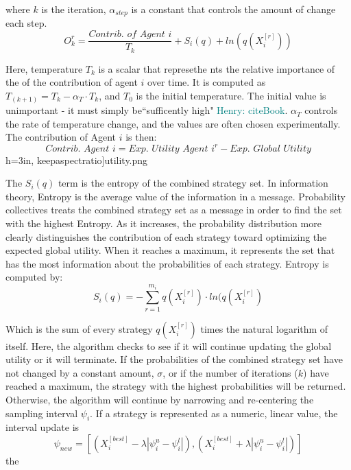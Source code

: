 \documentclass{sig-alternate}
\newcommand{\allcomments}[1]{{#1}}
\newcommand{\hfcomment}[1]{\textcolor{Teal}{\allcomments{Henry: {#1}}}}
\begin{document}
where $k$ is the iteration, $\alpha_{step}$ is a constant that controls the amount of change each step.
	\begin{equation}
	O_k^r = \dfrac{\textit{Contrib. of Agent }i}{T_k}+S_i(q)+ln(q(X_i^{[r]}))
	\end{equation}
	
Here, temperature $T_k$ is a scalar that represethe nts the relative importance of the of the contribution of agent $i$ over time. It is computed as $T_{(k+1)}=T_{k} - \alpha_{T}\cdot T_{k}$, and $T_0$ is the initial temperature. The initial value is unimportant - it must simply be``sufficently high" \hfcomment{cite{Book}}. $\alpha_{T}$ controls the rate of temperature change, and the values are often chosen experimentally.
The contribution of Agent $i$ is then:
	\begin{equation}
	\textit{Contrib. Agent }i = \textit{Exp. Utility Agent }i^r - \textit{Exp. Global Utility}
	\end{equation}h=3in, keepaspectratio]{utility.png}

The $S_i(q)$ term is the entropy of the combined strategy set. In information theory, Entropy is the average value of the information in a message. Probability collectives treats the combined strategy set as a message in order to find the set with the highest Entropy. As it increases, the probability distribution more clearly distinguishes the contribution of each strategy toward optimizing the expected global utility. When it reaches a maximum, it represents the set that has the most information about the probabilities of each strategy. Entropy is computed by:
	\begin{equation}
	S_i(q)=-\sum_{r=1}^{m_i}q(X_i^{[r]})\cdot ln(q(X_i^{[r]})
	\end{equation}
	
Which is the sum of every strategy $q(X_i^{[r]})$ times the natural logarithm of itself. Here, the algorithm checks to see if it will continue updating the global utility or it will terminate. If the probabilities of the combined strategy set have not changed by a constant amount, $\sigma$, or if the number of iterations ($k$) have reached a maximum, the strategy with the highest probabilities will be returned. Otherwise, the algorithm will continue by narrowing and re-centering the sampling interval $\psi_i$. If a strategy is represented as a numeric, linear value, the interval update is 
	\begin{equation}
	\psi_{new} = [(X_i^{[best]}-\lambda|\psi_i^u - \psi_i^l|),(X_i^{[best]}+\lambda|\psi_i^u - \psi_i^l|)]
	\end{equation}the 
\end{document}

